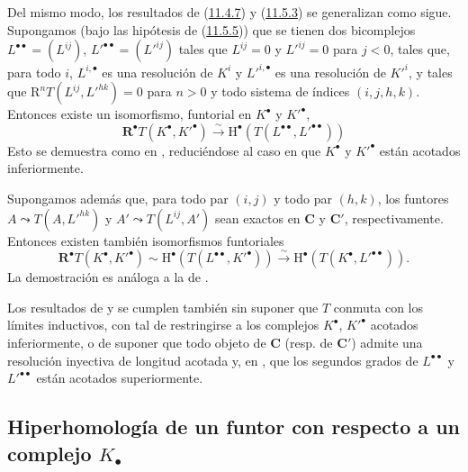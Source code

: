 \begin{env}[11.5.6]
\label{0.11.5.6-fr}
Del mismo modo, los resultados de (\hyperref[0.11.4.7-fr]{11.4.7}) y (\hyperref[0.11.5.3-fr]{11.5.3}) se generalizan como sigue. Supongamos (bajo las hipótesis de (\hyperref[0.11.5.5-fr]{11.5.5})) que se tienen dos bicomplejos $L^{\bullet\bullet}=(L^{ij})$, $L'^{\bullet\bullet}=(L'^{ij})$ tales que $L^{ij}=0$ y $L'^{ij}=0$ para $j<0$, tales que, para todo $i$, $L^{i,\bullet}$ es una resolución de $K^i$ y $L'^{i,\bullet}$ es una resolución de $K'^i$, y tales que
$\mathrm R^nT(L^{ij},L'^{hk})=0$
para $n>0$ y todo sistema de índices $(i,j,h,k)$.
Entonces existe un isomorfismo, funtorial en $K^\bullet$ y $K'^\bullet$,
\[
  \label{0.11.5.6.1-fr}
  \mathbf R^\bullet T(K^\bullet,K'^\bullet)\xrightarrow{\sim}
  \mathrm H^\bullet(T(L^{\bullet\bullet},L'^{\bullet\bullet}))
  \tag{11.5.6.1}
\]
Esto se demuestra como en , reduciéndose al caso en que $K^\bullet$ y $K'^\bullet$ están acotados inferiormente.

Supongamos además que, para todo par $(i,j)$ y todo par $(h,k)$, los funtores $A\leadsto T(A,L'^{hk})$ y $A'\leadsto T(L^{ij},A')$ sean exactos en $\boldsymbol{C}$ y $\boldsymbol{C}'$, respectivamente.
Entonces existen también isomorfismos funtoriales
\[
  \label{0.11.5.6.2-fr}
  \mathbf R^\bullet T(K^\bullet,K'^\bullet)
  \sim\mathrm H^\bullet(T(L^{\bullet\bullet},K'^\bullet))
  \xrightarrow{\sim}\mathrm H^\bullet(T(K^\bullet,L'^{\bullet\bullet})).
  \tag{11.5.6.2}
\]
La demostración es análoga a la de .
\end{env}

\begin{env}[11.5.7]
\label{0.11.5.7}
\label{0.11.5.7-fr}
Los resultados de  y  se cumplen también sin suponer que $T$ conmuta con los límites inductivos, con tal de restringirse a los complejos $K^\bullet$, $K'^\bullet$ acotados inferiormente, o de suponer que todo objeto de $\boldsymbol{C}$ (resp. de $\boldsymbol{C}'$) admite una resolución inyectiva de longitud acotada y, en , que los segundos grados de $L^{\bullet\bullet}$ y $L'^{\bullet\bullet}$ están acotados superiormente.
\end{env}

\subsection{Hiperhomología de un funtor con respecto a un complejo $K_\bullet$}
\label{subsection:0.11.6}
\label{subsection:0.11.6-fr}

